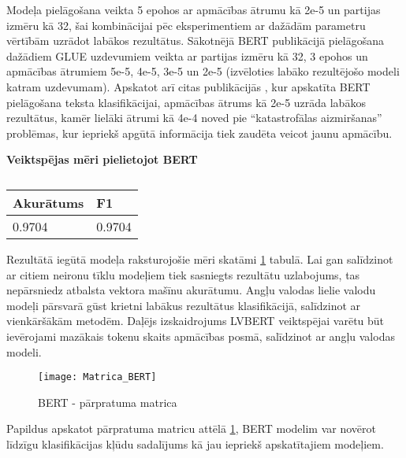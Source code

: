 Modeļa pielāgošana veikta 5 epohos ar apmācības ātrumu kā 2e-5 un partijas izmēru kā 32, šai kombinācijai pēc eksperimentiem ar dažādām parametru vērtībām uzrādot labākos rezultātus. Sākotnējā BERT publikācijā \cite{devlin2019bert} pielāgošana dažādiem GLUE uzdevumiem veikta ar partijas izmēru kā 32, 3 epohos un apmācības ātrumiem 5e-5, 4e-5, 3e-5 un 2e-5 (izvēloties labāko rezultējošo modeli katram uzdevumam).  Apskatot arī citas publikācijās \cite{sun2020finetune}, kur apskatīta BERT pielāgošana teksta klasifikācijai, apmācības ātrums kā 2e-5 uzrāda labākos rezultātus, kamēr lielāki ātrumi kā 4e-4 noved pie “katastrofālas aizmiršanas” problēmas, kur iepriekš apgūtā informācija tiek zaudēta veicot jaunu apmācību.

\begin{table}[H]
\centering
\caption{\label{tab:score_bert}}
\textbf{Veiktspējas mēri pielietojot BERT\\}
\begin{tabular}{|l|l|}
\hline
Akurātums & F1 \\ \hline
0.9704 & 0.9704  \\ \hline
\end{tabular}
\end{table}

Rezultātā iegūtā modeļa raksturojošie mēri skatāmi \ref{tab:score_bert} tabulā. Lai gan salīdzinot ar citiem neironu tīklu modeļiem tiek sasniegts rezultātu uzlabojums, tas nepārsniedz atbalsta vektora mašīnu akurātumu. Angļu valodas lielie valodu modeļi pārsvarā gūst krietni labākus rezultātus klasifikācijā, salīdzinot ar vienkāršākām metodēm. Daļējs izskaidrojums LVBERT veiktspējai varētu būt ievērojami mazākais tokenu skaits apmācības posmā, salīdzinot ar angļu valodas modeli.

\begin{figure}[H]
	\centering
	\texttt{[image: Matrica\_BERT]}
	\caption{BERT - pārpratuma matrica}
	\label{fig:Matrica_BERT}
\end{figure}

Papildus apskatot pārpratuma matricu attēlā \ref{fig:Matrica_BERT}, BERT modelim var novērot līdzīgu klasifikācijas kļūdu sadalījums kā jau iepriekš apskatītajiem modeļiem.

